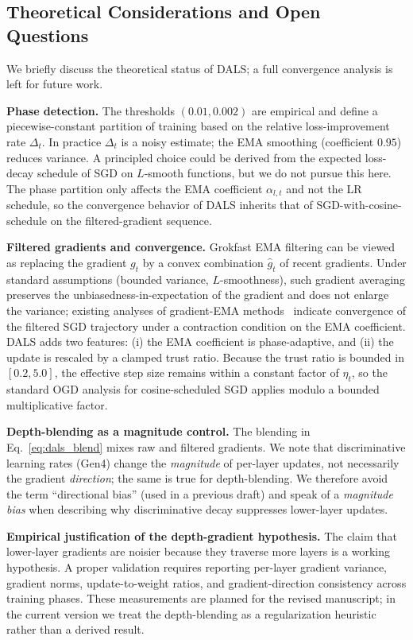 \documentclass[a4paper,fleqn]{cas-dc}
\begin{document}
\subsection{Theoretical Considerations and Open Questions}\label{sec:theory}

We briefly discuss the theoretical status of DALS; a full convergence analysis is left for future work.

\textbf{Phase detection.} The thresholds $(0.01,0.002)$ are empirical and define a piecewise-constant partition of training based on the relative loss-improvement rate $\Delta_t$. In practice $\Delta_t$ is a noisy estimate; the EMA smoothing (coefficient $0.95$) reduces variance. A principled choice could be derived from the expected loss-decay schedule of SGD on $L$-smooth functions, but we do not pursue this here. The phase partition only affects the EMA coefficient $\alpha_{l,t}$ and not the LR schedule, so the convergence behavior of DALS inherits that of SGD-with-cosine-schedule on the filtered-gradient sequence.

\textbf{Filtered gradients and convergence.} Grokfast EMA filtering can be viewed as replacing the gradient $g_t$ by a convex combination $\hat g_t$ of recent gradients. Under standard assumptions (bounded variance, $L$-smoothness), such gradient averaging preserves the unbiasedness-in-expectation of the gradient and does not enlarge the variance; existing analyses of gradient-EMA methods~\citet{chen2024grokfast} indicate convergence of the filtered SGD trajectory under a contraction condition on the EMA coefficient. DALS adds two features: (i) the EMA coefficient is phase-adaptive, and (ii) the update is rescaled by a clamped trust ratio. Because the trust ratio is bounded in $[0.2,5.0]$, the effective step size remains within a constant factor of $\eta_t$, so the standard OGD analysis for cosine-scheduled SGD applies modulo a bounded multiplicative factor.

\textbf{Depth-blending as a magnitude control.} The blending in Eq.~\eqref{eq:dals_blend} mixes raw and filtered gradients. We note that discriminative learning rates (Gen4) change the \emph{magnitude} of per-layer updates, not necessarily the gradient \emph{direction}; the same is true for depth-blending. We therefore avoid the term ``directional bias'' (used in a previous draft) and speak of a \emph{magnitude bias} when describing why discriminative decay suppresses lower-layer updates.

\textbf{Empirical justification of the depth-gradient hypothesis.} The claim that lower-layer gradients are noisier because they traverse more layers is a working hypothesis. A proper validation requires reporting per-layer gradient variance, gradient norms, update-to-weight ratios, and gradient-direction consistency across training phases. These measurements are planned for the revised manuscript; in the current version we treat the depth-blending as a regularization heuristic rather than a derived result.
\end{document}
